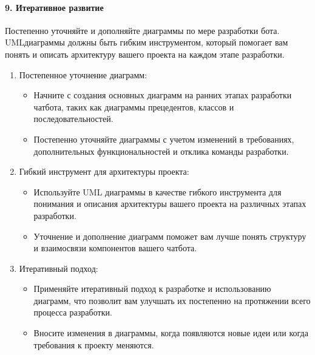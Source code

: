 \documentclass[letterpaper,10pt,russian]{sphinxmanual}
\begin{document}
\paragraph{9. Итеративное развитие}
\label{\detokenize{educational_materials/uml/content:id18}}
\sphinxAtStartPar
Постепенно уточняйте и дополняйте диаграммы по мере разработки бота. UML\sphinxhyphen{}диаграммы должны быть гибким инструментом, который помогает вам понять и описать архитектуру вашего проекта на каждом этапе разработки.
\begin{enumerate}
%
\item {} 
\sphinxAtStartPar
Постепенное уточнение диаграмм:
\begin{itemize}
\item {} 
\sphinxAtStartPar
Начните с создания основных диаграмм на ранних этапах разработки чат\sphinxhyphen{}бота, таких как диаграммы прецедентов, классов и последовательностей.

\item {} 
\sphinxAtStartPar
Постепенно уточняйте диаграммы с учетом изменений в требованиях, дополнительных функциональностей и отклика команды разработки.

\end{itemize}

\item {} 
\sphinxAtStartPar
Гибкий инструмент для архитектуры проекта:
\begin{itemize}
\item {} 
\sphinxAtStartPar
Используйте UML диаграммы в качестве гибкого инструмента для понимания и описания архитектуры вашего проекта на различных этапах разработки.

\item {} 
\sphinxAtStartPar
Уточнение и дополнение диаграмм поможет вам лучше понять структуру и взаимосвязи компонентов вашего чат\sphinxhyphen{}бота.

\end{itemize}

\item {} 
\sphinxAtStartPar
Итеративный подход:
\begin{itemize}
\item {} 
\sphinxAtStartPar
Применяйте итеративный подход к разработке и использованию диаграмм, что позволит вам улучшать их постепенно на протяжении всего процесса разработки.

\item {} 
\sphinxAtStartPar
Вносите изменения в диаграммы, когда появляются новые идеи или когда требования к проекту меняются.


\end{itemize}
\end{enumerate}
\end{document}
